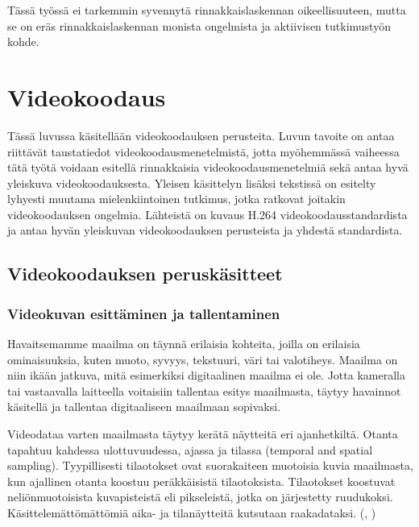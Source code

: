 Tässä työssä ei tarkemmin syvennytä rinnakkaislaskennan oikeellisuuteen, mutta
se on eräs rinnakkaislaskennan monista ongelmista ja aktiivisen tutkimustyön kohde.

\section{Videokoodaus}
\label{chap:coding}

Tässä luvussa käsitellään videokoodauksen perusteita. Luvun tavoite on
antaa riittävät taustatiedot videokoodausmenetelmistä, jotta myöhemmässä
vaiheessa tätä työtä voidaan esitellä rinnakkaisia
videokoodausmenetelmiä sekä antaa hyvä yleiskuva videokoodauksesta. Yleisen
käsittelyn lisäksi tekstissä on esitelty lyhyesti muutama mielenkiintoinen
tutkimus, jotka ratkovat joitakin videokoodauksen ongelmia. Lähteistä
\citealt{h264} on kuvaus H.264 videokoodausstandardista ja antaa hyvän
yleiskuvan videokoodauksen perusteista ja yhdestä standardista.

\subsection{Videokoodauksen peruskäsitteet}

\subsubsection{Videokuvan esittäminen ja tallentaminen}

Havaitsemamme maailma on täynnä erilaisia kohteita, joilla on
erilaisia ominaisuuksia, kuten muoto, syvyys, tekstuuri, väri tai valotiheys.
Maailma on niin ikään jatkuva, mitä esimerkiksi digitaalinen maailma ei ole. Jotta kameralla tai vastaavalla
laitteella voitaisiin tallentaa esitys maailmasta, täytyy havainnot käsitellä ja
tallentaa digitaaliseen maailmaan sopivaksi.

Videodataa varten maailmasta täytyy kerätä näytteitä eri ajanhetkiltä. Otanta
tapahtuu kahdessa ulottuvuudessa, ajassa ja tilassa (temporal and spatial
sampling). Tyypillisesti tilaotokset ovat suorakaiteen muotoisia kuvia
maailmasta, kun ajallinen otanta koostuu peräkkäisistä tilaotoksista.
Tilaotokset koostuvat neliönmuotoisista kuvapisteistä eli pikseleistä, jotka
on järjestetty ruudukoksi. Käsittelemättömättömiä aika- ja
tilanäytteitä kutsutaan raakadataksi. (\citealt{h264}, \citealt{du})

